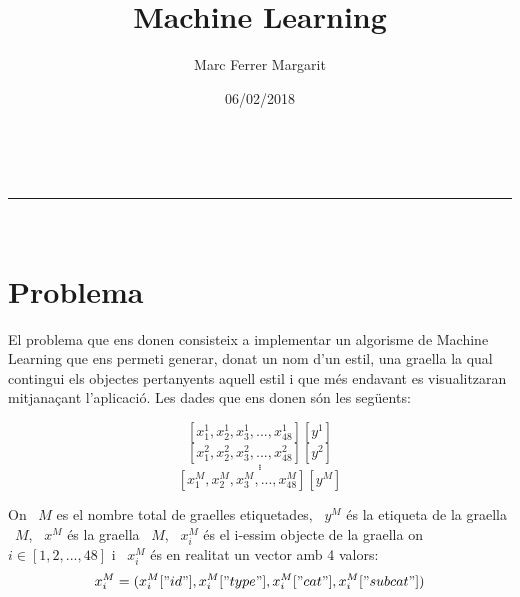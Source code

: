 \documentclass[a4paper,11pt]{article}
\makeatletter
\newcommand{\linia}{\rule{\linewidth}{0.5pt}}
\theoremstyle{mytheor}
\renewcommand{\maketitle}{
\begin{center}
\vspace{2ex}
{\huge \textsc{\@title}}
\vspace{1ex}
\\
\linia\\
\@author \hfill \@date
\vspace{4ex}
\end{center}
}
\makeatother
\begin{document}
\title{Machine Learning}

\author{Marc Ferrer Margarit}

\date{06/02/2018}

\maketitle

\section*{Problema}

El problema que ens donen consisteix a implementar un algorisme de Machine Learning que ens permeti generar, donat un nom d'un estil, una graella la qual contingui els objectes pertanyents aquell estil i que més endavant es visualitzaran mitjanaçant l'aplicació.
Les dades que ens donen són les següents:

\[[ x^1_1, x^1_2, x^1_3, ..., x_{48}^1 ][y^1]\]
\[[ x^2_1, x^2_2, x^2_3, ..., x_{48}^2 ][y^2]\]
\[.\]
\[.\]
\[.\]
\[[ x^M_1, x^M_2, x^M_3, ..., x_{48}^M ][y^M]\]

On ~$M$ es el nombre total de graelles etiquetades, ~$y^M$ és la etiqueta de la graella ~$M$, ~$x^M$ és la graella ~$M$, ~$x_i^M$ és el i-essim objecte de la graella on $i \in [1,2,...,48]$ i ~$x_i^M$ és en realitat un vector amb 4 valors:
\[x_i^M = (x_i^M["id"], x_i^M["type"], x_i^M["cat"],x_i^M["subcat"])\]
\end{document}

